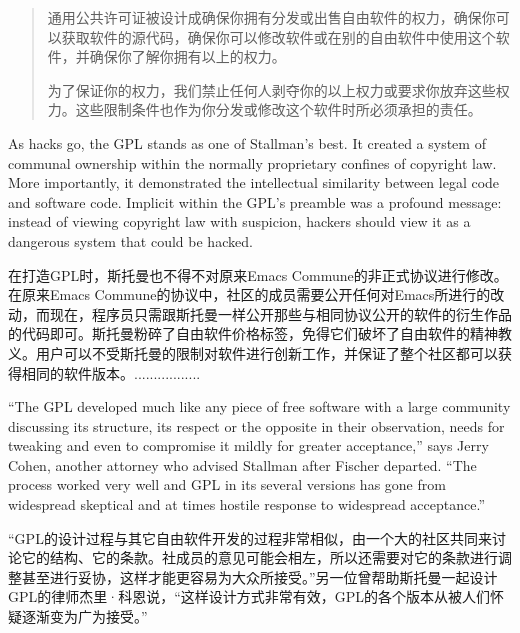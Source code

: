 \ifdefined\chs
\begin{quote}
通用公共许可证被设计成确保你拥有分发或出售自由软件的权力，确保你可以获取软件的源代码，确保你可以修改软件或在别的自由软件中使用这个软件，并确保你了解你拥有以上的权力。

为了保证你的权力，我们禁止任何人剥夺你的以上权力或要求你放弃这些权力。这些限制条件也作为你分发或修改这个软件时所必须承担的责任。

\end{quote}
\fi

\ifdefined\eng
As hacks go, the GPL stands as one of Stallman's best. It created a system of communal ownership within the normally proprietary confines of copyright law. More importantly, it demonstrated the intellectual similarity between legal code and software code. Implicit within the GPL's preamble was a profound message: instead of viewing copyright law with suspicion, hackers should view it as a dangerous system that could be hacked.
\fi

\ifdefined\chs
在打造GPL时，斯托曼也不得不对原来Emacs Commune的非正式协议进行修改。在原来Emacs Commune的协议中，社区的成员需要公开任何对Emacs所进行的改动，而现在，程序员只需跟斯托曼一样公开那些与相同协议公开的软件的衍生作品的代码即可。斯托曼粉碎了自由软件价格标签，免得它们破坏了自由软件的精神教义。用户可以不受斯托曼的限制对软件进行创新工作，并保证了整个社区都可以获得相同的软件版本。.................
\fi

\ifdefined\eng
``The GPL developed much like any piece of free software with a large community discussing its structure, its respect or the opposite in their observation, needs for tweaking and even to compromise it mildly for greater acceptance,'' says Jerry Cohen, another attorney who advised Stallman after Fischer departed. ``The process worked very well and GPL in its several versions has gone from widespread skeptical and at times hostile response to widespread acceptance.''
\fi

\ifdefined\chs
“GPL的设计过程与其它自由软件开发的过程非常相似，由一个大的社区共同来讨论它的结构、它的条款。社成员的意见可能会相左，所以还需要对它的条款进行调整甚至进行妥协，这样才能更容易为大众所接受。”另一位曾帮助斯托曼一起设计GPL的律师杰里·科恩说，“这样设计方式非常有效，GPL的各个版本从被人们怀疑逐渐变为广为接受。”
\fi

